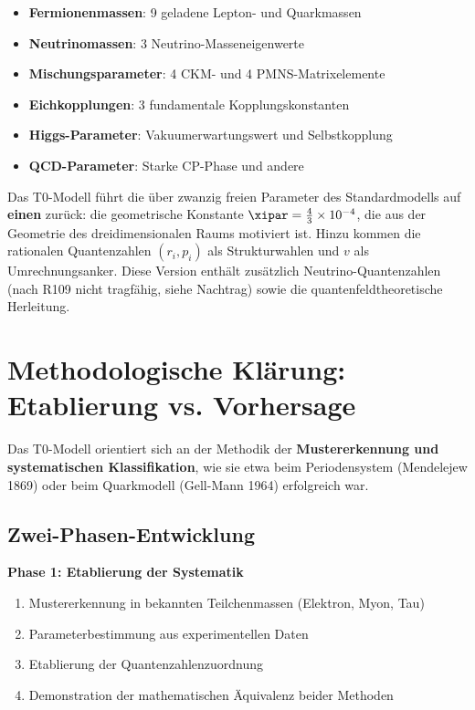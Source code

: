 \begin{itemize}
	\item \textbf{Fermionenmassen}: 9 geladene Lepton- und Quarkmassen
	\item \textbf{Neutrinomassen}: 3 Neutrino-Masseneigenwerte
	\item \textbf{Mischungsparameter}: 4 CKM- und 4 PMNS-Matrixelemente
	\item \textbf{Eichkopplungen}: 3 fundamentale Kopplungskonstanten
	\item \textbf{Higgs-Parameter}: Vakuumerwartungswert und Selbstkopplung
	\item \textbf{QCD-Parameter}: Starke CP-Phase und andere
\end{itemize}

\begin{important}[Parameterreduktion]
	Das T0-Modell führt die über zwanzig freien Parameter des Standardmodells auf \textbf{einen} zurück: die geometrische Konstante $\xipar = \frac{4}{3} \times 10^{-4}$, die aus der Geometrie des dreidimensionalen Raums motiviert ist. Hinzu kommen die rationalen Quantenzahlen $(r_i, p_i)$ als Strukturwahlen und $v$ als Umrechnungsanker. Diese Version enthält zusätzlich Neutrino-Quantenzahlen (nach R109 nicht tragfähig, siehe Nachtrag) sowie die quantenfeldtheoretische Herleitung.
\end{important}

\section{Methodologische Klärung: Etablierung vs. Vorhersage}
\label{sec:methodological_clarification}

\begin{important}
	Das T0-Modell orientiert sich an der Methodik der \textbf{Mustererkennung und systematischen Klassifikation}, wie sie etwa beim Periodensystem (Mendelejew 1869) oder beim Quarkmodell (Gell-Mann 1964) erfolgreich war.
\end{important}

\subsection{Zwei-Phasen-Entwicklung}
\label{subsec:two_phases}

\textbf{Phase 1: Etablierung der Systematik}
\begin{enumerate}
	\item Mustererkennung in bekannten Teilchenmassen (Elektron, Myon, Tau)
	\item Parameterbestimmung aus experimentellen Daten
	\item Etablierung der Quantenzahlenzuordnung
	\item Demonstration der mathematischen Äquivalenz beider Methoden
\end{enumerate}

